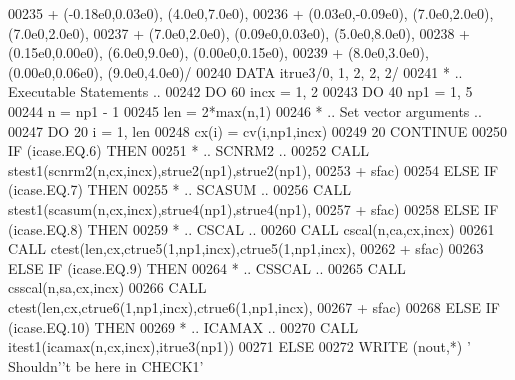 \begin{DoxyCode}
00235      +                  (-0.18e0,0.03e0), (4.0e0,7.0e0),
00236      +                  (0.03e0,-0.09e0), (7.0e0,2.0e0), (7.0e0,2.0e0),
00237      +                  (7.0e0,2.0e0), (0.09e0,0.03e0), (5.0e0,8.0e0),
00238      +                  (0.15e0,0.00e0), (6.0e0,9.0e0), (0.00e0,0.15e0),
00239      +                  (8.0e0,3.0e0), (0.00e0,0.06e0), (9.0e0,4.0e0)/
00240       \textcolor{keyword}{DATA}              itrue3/0, 1, 2, 2, 2/
00241 \textcolor{comment}{*     .. Executable Statements ..}
00242       \textcolor{keywordflow}{DO} 60 incx = 1, 2
00243          \textcolor{keywordflow}{DO} 40 np1 = 1, 5
00244             n = np1 - 1
00245             len = 2*max(n,1)
00246 \textcolor{comment}{*           .. Set vector arguments ..}
00247             \textcolor{keywordflow}{DO} 20 i = 1, len
00248                cx(i) = cv(i,np1,incx)
00249    20       \textcolor{keywordflow}{CONTINUE}
00250             \textcolor{keywordflow}{IF} (icase.EQ.6) \textcolor{keywordflow}{THEN}
00251 \textcolor{comment}{*              .. SCNRM2 ..}
00252                \textcolor{keyword}{CALL }stest1(scnrm2(n,cx,incx),strue2(np1),strue2(np1),
00253      +                     sfac)
00254             \textcolor{keywordflow}{ELSE} \textcolor{keywordflow}{IF} (icase.EQ.7) \textcolor{keywordflow}{THEN}
00255 \textcolor{comment}{*              .. SCASUM ..}
00256                \textcolor{keyword}{CALL }stest1(scasum(n,cx,incx),strue4(np1),strue4(np1),
00257      +                     sfac)
00258             \textcolor{keywordflow}{ELSE} \textcolor{keywordflow}{IF} (icase.EQ.8) \textcolor{keywordflow}{THEN}
00259 \textcolor{comment}{*              .. CSCAL ..}
00260                \textcolor{keyword}{CALL }cscal(n,ca,cx,incx)
00261                \textcolor{keyword}{CALL }ctest(len,cx,ctrue5(1,np1,incx),ctrue5(1,np1,incx),
00262      +                    sfac)
00263             \textcolor{keywordflow}{ELSE} \textcolor{keywordflow}{IF} (icase.EQ.9) \textcolor{keywordflow}{THEN}
00264 \textcolor{comment}{*              .. CSSCAL ..}
00265                \textcolor{keyword}{CALL }csscal(n,sa,cx,incx)
00266                \textcolor{keyword}{CALL }ctest(len,cx,ctrue6(1,np1,incx),ctrue6(1,np1,incx),
00267      +                    sfac)
00268             \textcolor{keywordflow}{ELSE} \textcolor{keywordflow}{IF} (icase.EQ.10) \textcolor{keywordflow}{THEN}
00269 \textcolor{comment}{*              .. ICAMAX ..}
00270                \textcolor{keyword}{CALL }itest1(icamax(n,cx,incx),itrue3(np1))
00271             \textcolor{keywordflow}{ELSE}
00272                \textcolor{keyword}{WRITE} (nout,*) \textcolor{stringliteral}{' Shouldn'}\textcolor{stringliteral}{'t be here in CHECK1'}

\end{DoxyCode}
